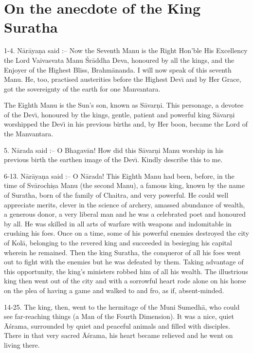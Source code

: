 \chapter{On the anecdote of the King Suratha}

1-4. N\=ar\=aya\d{n}a said :-- Now the Seventh Manu is the Right Hon'ble His Excellency the Lord Vaivasvata Manu \'Sr\=addha Deva, honoured by all the kings, and the Enjoyer of the Highest Bliss, Brahm\=ananda. I will now speak of this seventh Manu. He, too, practised austerities before the Highest Dev\={\i} and by Her Grace, got the sovereignty of the earth for one Manvantara.

The Eighth Manu is the Sun's son, known as S\=avar\d{n}i. This personage, a devotee of the Dev\={\i}, honoured by the kings, gentle, patient and powerful king S\=avar\d{n}i worshipped the Dev\={\i} in his previous births and, by Her boon, became the Lord of the Manvantara.

5. N\=arada said :-- O Bhagav\=an! How did this S\=avar\d{n}i Manu worship in his previous birth the earthen image of the Dev\={\i}. Kindly describe this to me.

6-13. N\=ar\=aya\d{n}a said :-- O N\=arada! This Eighth Manu had been, before, in the time of Sv\=arochi\d{s}a Manu (the second Manu), a famous king, known by the name of Suratha, born of the family of Chaitra, and very powerful. He could well appreciate merits, clever in the science of archery, amassed abundance of wealth, a generous donor, a very liberal man and he was a celebrated poet and honoured by all. He was skilled in all arts of warfare with weapons and indomitable in crushing his foes. Once on a time, some of his powerful enemies destroyed the city of Kol\=a, belonging to the revered king and succeeded in besieging his capital wherein he remained. Then the king Suratha, the conqueror of all his foes went out to fight with the enemies but he was defeated by them. Taking advantage of this opportunity, the king's ministers robbed him of all his wealth. The illustrious king then went out of the city and with a sorrowful heart rode alone on his horse on the plea of having a game and walked to and fro, as if, absent-minded.

14-25. The king, then, went to the hermitage of the Muni Sumedh\=a, who could see far-reaching things (a Man of the Fourth Dimension). It was a nice, quiet \=A\'srama, surrounded by quiet and peaceful animals and filled with disciples. There in that very sacred \=A\'srama, his heart became relieved and he went on living there.

